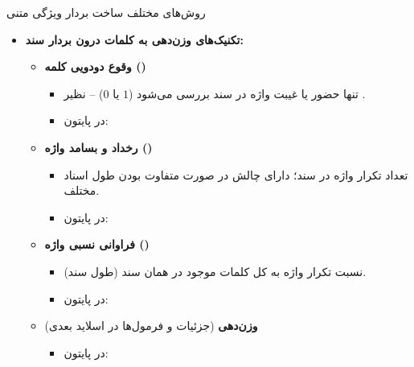\begin{frame}{روش‌های مختلف ساخت بردار ویژگی متنی}
\begin{itemize}
  \item \textbf{تکنیک‌های وزن‌دهی به کلمات درون بردار سند:}
  \begin{itemize}
    \item \textbf{وقوع دودویی کلمه ()}
    \begin{itemize}
      \item تنها حضور یا غیبت واژه در سند بررسی می‌شود ($1$ یا $0$) -- نظیر .
      \item در پایتون: 
    \end{itemize}
    \vspace{0.15cm}
    \item \textbf{رخداد و بسامد واژه ()}
    \begin{itemize}
      \item تعداد تکرار واژه در سند؛ دارای چالش در صورت متفاوت بودن طول اسناد مختلف.
      \item در پایتون: 
    \end{itemize}
    \vspace{0.15cm}
    \item \textbf{فراوانی نسبی واژه ()}
    \begin{itemize}
      \item نسبت تکرار واژه به کل کلمات موجود در همان سند (طول سند).
      \item در پایتون: 
    \end{itemize}
    \vspace{0.15cm}
    \item \textbf{وزن‌دهی } (جزئیات و فرمول‌ها در اسلاید بعدی)
    \begin{itemize}
      \item در پایتون: 
    \end{itemize}
  \end{itemize}
\end{itemize}
\end{frame}

